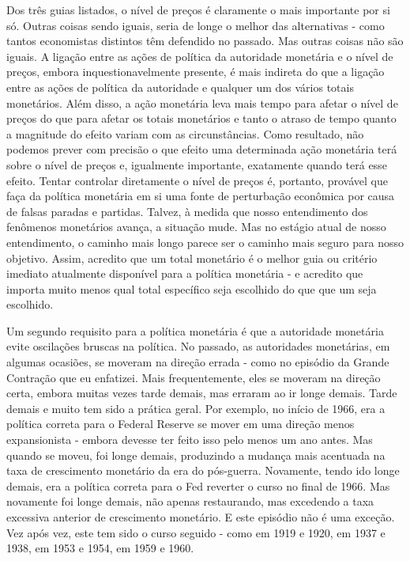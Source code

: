 \documentclass[a4paper,12pt]{article}[abntex2]
\begin{document}
Dos três guias listados, o nível de preços é claramente o mais importante por si só. Outras coisas sendo iguais, seria de longe o melhor das alternativas - como tantos economistas distintos têm defendido no passado. Mas outras coisas não são iguais. A ligação entre as ações de política da autoridade monetária e o nível de preços, embora inquestionavelmente presente, é mais indireta do que a ligação entre as ações de política da autoridade e qualquer um dos vários totais monetários. Além disso, a ação monetária leva mais tempo para afetar o nível de preços do que para afetar os totais monetários e tanto o atraso de tempo quanto a magnitude do efeito variam com as circunstâncias. Como resultado, não podemos prever com precisão o que efeito uma determinada ação monetária terá sobre o nível de preços e, igualmente importante, exatamente quando terá esse efeito. Tentar controlar diretamente o nível de preços é, portanto, provável que faça da política monetária em si uma fonte de perturbação econômica por causa de falsas paradas e partidas. Talvez, à medida que nosso entendimento dos fenômenos monetários avança, a situação mude. Mas no estágio atual de nosso entendimento, o caminho mais longo parece ser o caminho mais seguro para nosso objetivo. Assim, acredito que um total monetário é o melhor guia ou critério imediato atualmente disponível para a política monetária - e acredito que importa muito menos qual total específico seja escolhido do que que um seja escolhido.

Um segundo requisito para a política monetária é que a autoridade monetária evite oscilações bruscas na política. No passado, as autoridades monetárias, em algumas ocasiões, se moveram na direção errada - como no episódio da Grande Contração que eu enfatizei. Mais frequentemente, eles se moveram na direção certa, embora muitas vezes tarde demais, mas erraram ao ir longe demais. Tarde demais e muito tem sido a prática geral. Por exemplo, no início de 1966, era a política correta para o Federal Reserve se mover em uma direção menos expansionista - embora devesse ter feito isso pelo menos um ano antes. Mas quando se moveu, foi longe demais, produzindo a mudança mais acentuada na taxa de crescimento monetário da era do pós-guerra. Novamente, tendo ido longe demais, era a política correta para o Fed reverter o curso no final de 1966. Mas novamente foi longe demais, não apenas restaurando, mas excedendo a taxa excessiva anterior de crescimento monetário. E este episódio não é uma exceção. Vez após vez, este tem sido o curso seguido - como em 1919 e 1920, em 1937 e 1938, em 1953 e 1954, em 1959 e 1960.
\end{document}
